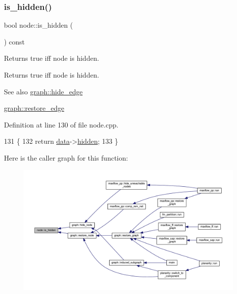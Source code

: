 \subsubsection{\texorpdfstring{is\+\_\+hidden()}{is\_hidden()}}
{\footnotesize\ttfamily bool node\+::is\+\_\+hidden (\begin{DoxyParamCaption}{ }\end{DoxyParamCaption}) const}

Returns true iff node is hidden.

\begin{DoxyReturn}{Returns}
true iff node is hidden. 
\end{DoxyReturn}
\begin{DoxySeeAlso}{See also}
\mbox{\hyperlink{classgraph_ab2f8520bcac080d73c55228fecc61825}{graph\+::hide\+\_\+edge}} 

\mbox{\hyperlink{classgraph_a2e5426682a0897b9f9104b019970bedc}{graph\+::restore\+\_\+edge}} 
\end{DoxySeeAlso}


Definition at line 130 of file node.\+cpp.


\begin{DoxyCode}
131 \{
132     \textcolor{keywordflow}{return} \mbox{\hyperlink{classnode_a4ae3d54ebb61be3a102bedf5b91bef75}{data}}->\mbox{\hyperlink{classnode__data_a0a841a84f5038562908d726392ce1b55}{hidden}};
133 \}
\end{DoxyCode}
Here is the caller graph for this function\+:\nopagebreak
\begin{figure}[H]
\begin{center}
\leavevmode
\includegraphics[width=350pt]{classnode_af948e15fd00a31e67928c9061acda582_icgraph}
\end{center}
\end{figure}
\mbox{\label{classnode_a4af4fd2f8efa1f98369585862077e1a9}} 
